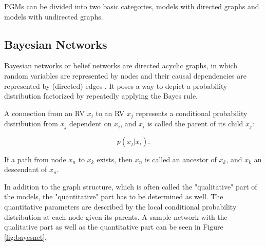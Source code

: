 PGMs can be divided into two basic categories, models with directed graphs and models with undirected graphs.


\subsection{Bayesian Networks} \label{c:bayesnet}

Bayesian networks or belief networks are directed acyclic graphs, in which random variables are represented by nodes and their causal dependencies are represented by (directed) edges \cite{Faltin2007}\cite{Goodfellow-et-al-2016-Book}. 
It poses a way to depict a probability distribution factorized by repeatedly applying the Bayes rule.

A connection from an RV $x_i$ to an RV $x_j$ represents a conditional probability distribution from $x_j$ dependent on $x_i$, and $x_i$ is called the parent of its child $x_j$:

\[
p(x_j | x_i) .
\]


If a path from node $x_n$ to $x_k$ exists, then $x_n$ is called an ancestor of $x_k$, and $x_k$ an descendant of $x_n$. 

In addition to the graph structure, which is often called the "qualitative" part of the models, the "quantitative" part has to be determined as well.
The quantitative parameters are described by the local conditional probability distribution at each node given its parents.
A sample network with the qualitative part as well as the quantitative part can be seen in Figure \ref{fig:bayesnet}. 

